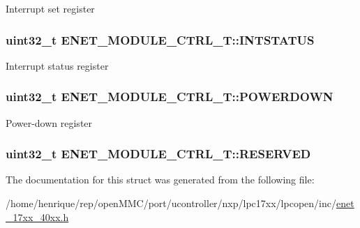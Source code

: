 Interrupt set register \hypertarget{structENET__MODULE__CTRL__T_a7dac73c2fd05c5247f006717dbe6c9fa}{
\subsubsection[{I\-N\-T\-S\-T\-A\-T\-U\-S}]{ uint32\-\_\-t E\-N\-E\-T\-\_\-\-M\-O\-D\-U\-L\-E\-\_\-\-C\-T\-R\-L\-\_\-\-T\-::\-I\-N\-T\-S\-T\-A\-T\-U\-S}}\label{structENET__MODULE__CTRL__T_a7dac73c2fd05c5247f006717dbe6c9fa}
Interrupt status register \hypertarget{structENET__MODULE__CTRL__T_a42b5ebd11c8549b2ba2bb072b5b42736}{
\subsubsection[{P\-O\-W\-E\-R\-D\-O\-W\-N}]{ uint32\-\_\-t E\-N\-E\-T\-\_\-\-M\-O\-D\-U\-L\-E\-\_\-\-C\-T\-R\-L\-\_\-\-T\-::\-P\-O\-W\-E\-R\-D\-O\-W\-N}}\label{structENET__MODULE__CTRL__T_a42b5ebd11c8549b2ba2bb072b5b42736}
Power-\/down register \hypertarget{structENET__MODULE__CTRL__T_a511b82f8a23341a28b95e615d75580ef}{
\subsubsection[{R\-E\-S\-E\-R\-V\-E\-D}]{\setlength{\rightskip}{0pt plus 5cm}uint32\-\_\-t E\-N\-E\-T\-\_\-\-M\-O\-D\-U\-L\-E\-\_\-\-C\-T\-R\-L\-\_\-\-T\-::\-R\-E\-S\-E\-R\-V\-E\-D}}\label{structENET__MODULE__CTRL__T_a511b82f8a23341a28b95e615d75580ef}


The documentation for this struct was generated from the following file\-:\begin{DoxyCompactItemize}
\item 
/home/henrique/rep/open\-M\-M\-C/port/ucontroller/nxp/lpc17xx/lpcopen/inc/\hyperlink{enet__17xx__40xx_8h}{enet\-\_\-17xx\-\_\-40xx.\-h}\end{DoxyCompactItemize}
